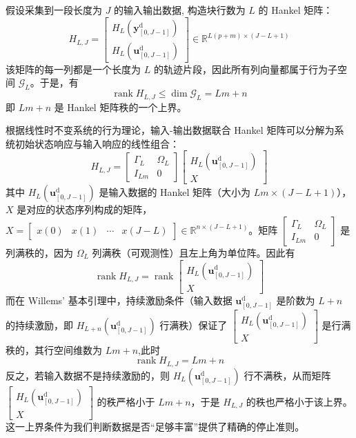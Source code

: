 假设采集到一段长度为 \(J\) 的输入输出数据, 构造块行数为 \(L\) 的 Hankel 矩阵：
\[
H_{L,J} = \begin{bmatrix} H_L(\mathbf{y}^{\mathrm{d}}_{[0,J-1]}) \\ H_L(\mathbf{u}^{\mathrm{d}}_{[0,J-1]}) \end{bmatrix} \in \mathbb{R}^{L(p+m) \times (J-L+1)}
\]
该矩阵的每一列都是一个长度为 \(L\) 的轨迹片段，因此所有列向量都属于行为子空间 \(\mathcal{G}_L\)。于是，有
\[
\operatorname{rank} H_{L,J} \le \dim \mathcal{G}_L = L m + n 
\]
即 \(L m + n\) 是 Hankel 矩阵秩的一个上界。

根据线性时不变系统的行为理论，输入-输出数据联合 Hankel 矩阵可以分解为系统初始状态响应与输入响应的线性组合：
\begin{equation}
	H_{L,J} = \begin{bmatrix} \Gamma_L & \Omega_L \\ I_{L m} & 0  \end{bmatrix}
	\begin{bmatrix} H_L(\mathbf{u}^{\mathrm{d}}_{[0,J-1]}) \\ X \end{bmatrix}
\end{equation}
其中 \(H_L(\mathbf{u}^{\mathrm{d}}_{[0,J-1]})\) 是输入数据的 Hankel 矩阵（大小为 \(L m \times (J-L+1)\)），\(X\) 是对应的状态序列构成的矩阵，\(X = \begin{bmatrix} x(0) & x(1) & \cdots & x(J-L) \end{bmatrix} \in \mathbb{R}^{n \times (J-L+1)}\)。矩阵 \(\begin{bmatrix} \Gamma_L & \Omega_L \\ I_{L m} & 0 \end{bmatrix}\) 是列满秩的，因为 \(\Omega_L\) 列满秩（可观测性）且左上角为单位阵。因此有
\begin{equation}
	\operatorname{rank} H_{L,J} = \operatorname{rank} \begin{bmatrix} H_L(\mathbf{u}^{\mathrm{d}}_{[0,J-1]}) \\ X \end{bmatrix}
\end{equation}
而在 Willems' 基本引理中，持续激励条件（输入数据 \(\mathbf{u}^{\mathrm{d}}_{[0,J-1]}\) 是阶数为 \(L+n\) 的持续激励，即 \(H_{L+n}(\mathbf{u}^{\mathrm{d}}_{[0,J-1]})\) 行满秩）保证了 \(\begin{bmatrix} H_L(\mathbf{u}^{\mathrm{d}}_{[0,J-1]}) \\ X \end{bmatrix}\) 是行满秩的，其行空间维数为 \(L m + n\),此时
\begin{equation}
	\operatorname{rank} H_{L,J} = L m + n
\end{equation}
反之，若输入数据不是持续激励的，则 \(H_L(\mathbf{u}^{\mathrm{d}}_{[0,J-1]})\) 行不满秩，从而矩阵 \(\begin{bmatrix} H_L(\mathbf{u}^{\mathrm{d}}_{[0,J-1]}) \\ X \end{bmatrix}\) 的秩严格小于 \(L m + n\)，于是 \(H_{L,J}\) 的秩也严格小于该上界。这一上界条件为我们判断数据是否“足够丰富”提供了精确的停止准则。

